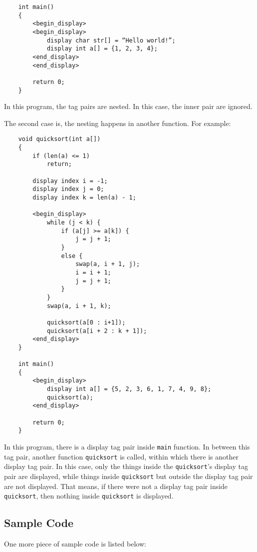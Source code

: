 \begin{verbatim}
    int main()
    {
        <begin_display>
        <begin_display>
            display char str[] = “Hello world!”;
            display int a[] = {1, 2, 3, 4};
        <end_display>
        <end_display>

        return 0;
    }
\end{verbatim}

In this program, the tag pairs are nested. In this case, the inner pair are ignored.

The second case is, the nesting happens in another function. For example:

\begin{verbatim}
    void quicksort(int a[])
    {
        if (len(a) <= 1)
            return;

        display index i = -1;
        display index j = 0;
        display index k = len(a) - 1;

        <begin_display>
            while (j < k) {
                if (a[j] >= a[k]) {
                    j = j + 1;
                }
                else {
                    swap(a, i + 1, j);
                    i = i + 1;
                    j = j + 1;
                }
            }
            swap(a, i + 1, k);

            quicksort(a[0 : i+1]);
            quicksort(a[i + 2 : k + 1]);
        <end_display>
    }
   
    int main()
    {
        <begin_display>
            display int a[] = {5, 2, 3, 6, 1, 7, 4, 9, 8};
            quicksort(a);
        <end_display>

        return 0;
    }
\end{verbatim}

In this program, there is a display tag pair inside \verb"main" function. In between this tag pair,
another function \verb"quicksort" is called, within which there is another display tag pair. In this
case, only the things inside the \verb"quicksort"’s display tag pair are displayed, while things
inside \verb"quicksort" but outside the display tag pair are not displayed.  That means, if there
were not a display tag pair inside \verb"quicksort", then nothing inside \verb"quicksort" is
displayed.

\subsection{Sample Code}

One more piece of sample code is listed below:

